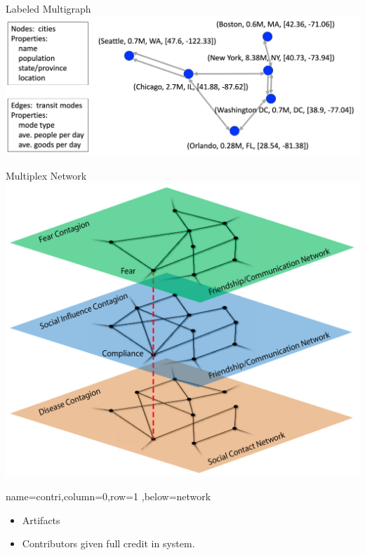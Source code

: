 \documentclass[landscape,paperwidth=70in,paperheight=46in,fontscale=0.225]{baposter} %
\begin{document}
\begin{poster}
{\begin{minipage}{.5\textwidth}        
Labeled Multigraph
\centering
\includegraphics[scale=0.22]{figures/single_net.png}
\end{minipage}
\hfill
 \begin{minipage}{.45\textwidth}      
 Multiplex Network
 \centering
\includegraphics[scale=0.3]{figures/multi_net.png}
\end{minipage}
}
          {name=contri,column=0,row=1 ,below=network}{
\begin{itemize}[leftmargin=*,noitemsep,topsep=0pt]
\item Artifacts
\item Contributors given full credit in system.
\end{itemize}

}
\end{poster}
\end{document}
